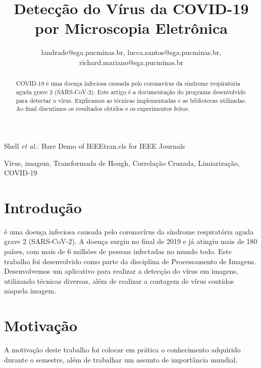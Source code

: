 \documentclass[conference, brazil]{IEEEtran}
\begin{document}
\title{Detecção do Vírus da COVID-19 por Microscopia Eletrônica}    

\author{
landrade@sga.pucminas.br, lucca.santos@sga.pucminas.br, richard.mariano@sga.pucminas.br}


%
{Shell \MakeLowercase{\textit{et al.}}: Bare Demo of IEEEtran.cls for IEEE Journals}

\maketitle
\begin{abstract}
COVID-19 é uma doença infeciosa causada pelo coronavírus da síndrome respiratória aguda grave 2 (SARS-CoV-2). Este artigo é a documentação do programa desenvolvido para detectar o vírus. Explicamos as técnicas implementadas e as bibliotecas utilizadas. Ao final discutimos os resultados obtidos e os experimentos feitos.

\end{abstract}

\begin{IEEEkeywords}
Vírus, imagem, Transformada de Hough, Correlação Cruzada, Limiarização, COVID-19
\end{IEEEkeywords}


\IEEEpeerreviewmaketitle

\section{Introdução} %
\label{sec:introduction}
 é uma doença infeciosa causada pelo coronavírus da síndrome respiratória aguda grave 2 (SARS-CoV-2). A doença surgiu no final de 2019 e já atingiu mais de 180 países, com mais de 6 milhões de pessoas infectadas no mundo todo. Este trabalho foi desenvolvido como parte da disciplina de Processamento de Imagens. Desenvolvemos um aplicativo para realizar a detecção do vírus em imagens, utilizando técnicas diversas, além de realizar a contagem de vírus contidos naquela imagem. 

\section{Motivação}
\label{sec:relatedwork}
A motivação deste trabalho foi colocar em prática o conhecimento adquirido durante o semestre, além de trabalhar um assunto de importância mundial.
\end{document}
